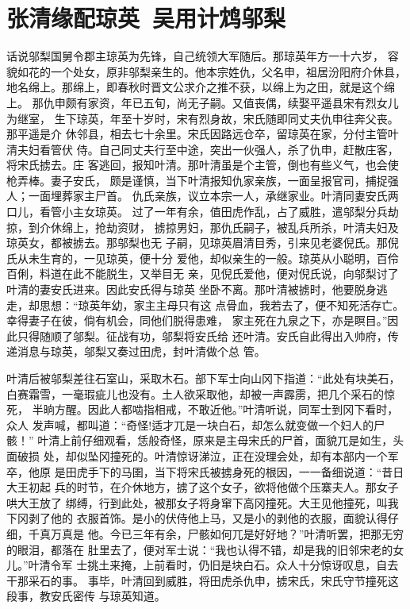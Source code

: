 \chapter{张清缘配琼英~吴用计鸩邬梨}

话说邬梨国舅令郡主琼英为先锋，自己统领大军随后。那琼英年方一十六岁，
容貌如花的一个处女，原非邬梨亲生的。他本宗姓仇，父名申，祖居汾阳府介休县，
地名绵上。那绵上，即春秋时晋文公求介之推不获，以绵上为之田，就是这个绵上。
那仇申颇有家资，年已五旬，尚无子嗣。又值丧偶，续娶平遥县宋有烈女儿为继室，
生下琼英，年至十岁时，宋有烈身故，宋氏随即同丈夫仇申往奔父丧。那平遥是介
休邻县，相去七十余里。宋氏因路远仓卒，留琼英在家，分付主管叶清夫妇看管伏
侍。自己同丈夫行至中途，突出一伙强人，杀了仇申，赶散庄客，将宋氏掳去。庄
客逃回，报知叶清。那叶清虽是个主管，倒也有些义气，也会使枪弄棒。妻子安氏，
颇是谨慎，当下叶清报知仇家亲族，一面呈报官司，捕捉强人；一面埋葬家主尸首。
仇氏亲族，议立本宗一人，承继家业。叶清同妻安氏两口儿，看管小主女琼英。
过了一年有余，值田虎作乱，占了威胜，遣邬梨分兵劫掠，到介休绵上，抢劫资财，
掳掠男妇，那仇氏嗣子，被乱兵所杀，叶清夫妇及琼英女，都被掳去。那邬梨也无
子嗣，见琼英眉清目秀，引来见老婆倪氏。那倪氏从未生育的，一见琼英，便十分
爱他，却似亲生的一般。琼英从小聪明，百伶百俐，料道在此不能脱生，又举目无
亲，见倪氏爱他，便对倪氏说，向邬梨讨了叶清的妻安氏进来。因此安氏得与琼英
坐卧不离。那叶清被掳时，他要脱身逃走，却思想：“琼英年幼，家主主母只有这
点骨血，我若去了，便不知死活存亡。幸得妻子在彼，倘有机会，同他们脱得患难，
家主死在九泉之下，亦是瞑目。”因此只得随顺了邬梨。征战有功，邬梨将安氏给
还叶清。安氏自此得出入帅府，传递消息与琼英，邬梨又奏过田虎，封叶清做个总
管。

叶清后被邬梨差往石室山，采取木石。部下军士向山冈下指道：“此处有块美石，
白赛霜雪，一毫瑕疵儿也没有。土人欲采取他，却被一声霹雳，把几个采石的惊死，
半晌方醒。因此人都啮指相戒，不敢近他。”叶清听说，同军士到冈下看时，众人
发声喊，都叫道：“奇怪!适才兀是一块白石，却怎么就变做一个妇人的尸骸！”
叶清上前仔细观看，恁般奇怪，原来是主母宋氏的尸首，面貌兀是如生，头面破损
处，却似坠冈撞死的。叶清惊讶涕泣，正在没理会处，却有本部内一个军卒，他原
是田虎手下的马圉，当下将宋氏被掳身死的根因，一一备细说道：“昔日大王初起
兵的时节，在介休地方，掳了这个女子，欲将他做个压寨夫人。那女子哄大王放了
绑缚，行到此处，被那女子将身窜下高冈撞死。大王见他撞死，叫我下冈剥了他的
衣服首饰。是小的伏侍他上马，又是小的剥他的衣服，面貌认得仔细，千真万真是
他。今已三年有余，尸骸如何兀是好好地？”叶清听罢，把那无穷的眼泪，都落在
肚里去了，便对军士说：“我也认得不错，却是我的旧邻宋老的女儿。”叶清令军
士挑土来掩，上前看时，仍旧是块白石。众人十分惊讶叹息，自去干那采石的事。
事毕，叶清回到威胜，将田虎杀仇申，掳宋氏，宋氏守节撞死这段事，教安氏密传
与琼英知道。

